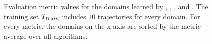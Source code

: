 \begin{figure}[ht]
\caption{Evaluation metric values for the domains learned by \sam, \offlam, \nolam, and \rosame. The training set $T_{train}$ includes $10$ trajectories for every domain. For every metric, the domains on the x-axis are sorted by the metric average over all algorithms.  }
\end{figure} 

